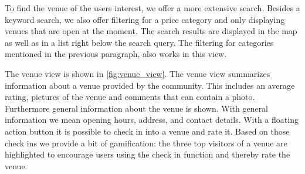 \documentclass[11pt, accentcolor=tud1c]{tudreport}
\begin{document}
To find the venue of the users interest, we offer a more extensive search. Besides a keyword search, we also offer filtering for a price category and only displaying venues that are open at the moment. The search results are displayed in the map as well as in a list right below the search query. The filtering for categories mentioned in the previous paragraph, also works in this view. 

The venue view is shown in \autoref{fig:venue_view}. The venue view summarizes information about a venue provided by the community. This includes an average rating, pictures of the venue and comments that can contain a photo. Furthermore general information about the venue is shown. With general information we mean opening hours, address, and contact details. With a floating action button it is possible to check in into a venue and rate it. Based on those check ins we provide a bit of gamification: the three top visitors of a venue are highlighted to encourage users using the check in function and thereby rate the venue.
\end{document}
